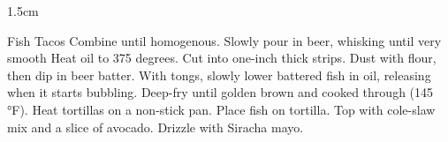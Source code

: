 \documentclass[]{article}
\title{}
\author{}
\begin{document}
\RecipeWidths{\textwidth}{3cm}{0.5cm}{3cm}{.75cm} {1.5cm}

\begin{recipe}{Fish Tacos}{}{}	
	Combine until homogenous.
	Slowly pour in beer, whisking until very smooth
	Heat oil to 375 degrees. 
	Cut into one-inch thick strips. Dust with flour, then dip in beer batter. With tongs, slowly lower battered fish in oil, releasing when it starts bubbling. Deep-fry until golden brown and cooked through (145 °F). 
	Heat tortillas on a non-stick pan. 
	Place fish on tortilla. Top with cole-slaw mix and a slice of avocado. Drizzle with Siracha mayo. 
\end{recipe}
\end{document}

